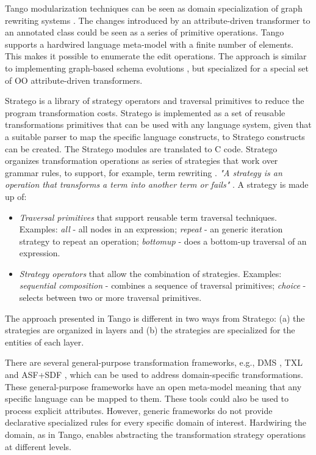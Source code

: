 Tango modularization techniques can be seen as domain specialization of graph rewriting systems \cite{term.rewrite,Nagl:96,mens.99}. The changes introduced by an attribute-driven transformer to an annotated class could be seen as a series of primitive operations. Tango supports a hardwired language meta-model with a finite number of elements. This makes it possible to enumerate the edit operations. The approach is similar to implementing graph-based schema evolutions \cite{Banerjee.87}, but specialized for a special set of OO attribute-driven transformers.

Stratego \cite{stratego.01,ptm.03} is a library of strategy operators and traversal primitives to reduce the program transformation costs. Stratego is implemented as a set of reusable transformations primitives that can be used with any language system, given that a suitable parser to map the specific language constructs, to Stratego constructs can be created. The Stratego modules are translated to C code. Stratego organizes transformation operations as series of strategies that work over grammar rules, to support, for example, term rewriting \cite{term.rewrite}. \textit{"A strategy is an operation that transforms a term into another term or fails"} \cite{stratego.01}. A strategy is made up of:
\begin{itemize}
\item \textit{Traversal primitives} that support reusable term traversal techniques. Examples: \textit{all} - all nodes in an expression; \textit{repeat} - an generic iteration strategy to repeat an operation; \textit{bottomup} - does a bottom-up traversal of an expression.
\item \textit{Strategy operators} that allow the combination of strategies. Examples: \textit{sequential composition} - combines a sequence of  traversal primitives; \textit{choice} - selects between two or more traversal primitives. 
\end{itemize}

\noindent The approach presented in Tango is different in two ways from Stratego: (a) the strategies are organized in layers and (b) the strategies are specialized for the entities of each layer.

There are several general-purpose transformation frameworks, e.g., DMS \cite{dms.02}, TXL \cite{txl.04} and ASF+SDF \cite{asfsdf.02}, which can be used to address domain-specific transformations. These general-purpose frameworks have an open meta-model meaning that any specific language can be mapped to them. These tools could also be used to process explicit attributes. However, generic frameworks do not provide declarative specialized rules for every specific domain of interest. Hardwiring the domain, as in Tango, enables abstracting the transformation strategy operations at different levels. 


